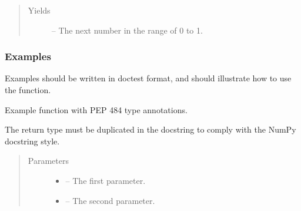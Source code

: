 \documentclass[letterpaper,10pt,english]{sphinxmanual}
\begin{document}
\begin{description}
\begin{fulllineitems}
\begin{quote}
\begin{description}
\item[{Yields}] \leavevmode
{} – The next number in the range of 0 to  \sphinxhyphen{} 1.

\end{description}\end{quote}
\subsubsection*{Examples}

Examples should be written in doctest format, and should illustrate how
to use the function.

\begin{sphinxVerbatim}[commandchars=\\\{\}]
\PYG{p}{[}    \PYG{p}{]}
\end{sphinxVerbatim}

\end{fulllineitems}


\begin{fulllineitems}
\label{\detokenize{autogen:example_docstring.function_with_pep484_type_annotations}}
Example function with PEP 484 type annotations.

The return type must be duplicated in the docstring to comply
with the NumPy docstring style.
\begin{quote}\begin{description}
\item[{Parameters}] \leavevmode\begin{itemize}
\item {} 
 – The first parameter.

\item {} 
 – The second parameter.


\end{itemize}
\end{description}
\end{quote}
\end{fulllineitems}
\end{description}
\end{document}

